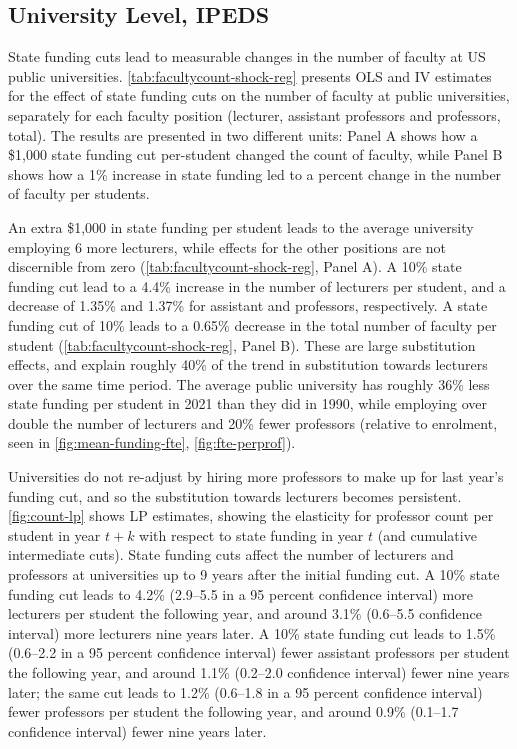 \subsection{University Level, IPEDS}
\label{sec:results-ipeds}
State funding cuts lead to measurable changes in the number of faculty at US public universities.
\autoref{tab:facultycount-shock-reg} presents OLS and IV estimates for the effect of state funding cuts on the number of faculty at public universities, separately for each faculty position (lecturer, assistant professors and professors, total).
The results are presented in two different units: Panel A shows how a \$1,000 state funding cut per-student changed the count of faculty, while Panel B shows how a 1\% increase in state funding led to a percent change in the number of faculty per students.

An extra \$1,000 in state funding per student leads to the average university employing 6 more lecturers, while effects for the other positions are not discernible from zero (\autoref{tab:facultycount-shock-reg}, Panel A).
A 10\% state funding cut lead to a 4.4\% increase in the number of lecturers per student, and a decrease of 1.35\% and 1.37\% for assistant and professors, respectively.
A state funding cut of 10\% leads to a 0.65\% decrease in the total number of faculty per student (\autoref{tab:facultycount-shock-reg}, Panel B).
These are large substitution effects, and explain roughly 40\% of the trend in substitution towards lecturers over the same time period.
The average public university has roughly 36\% less state funding per student in 2021 than they did in 1990, while employing over double the number of lecturers and 20\% fewer professors (relative to enrolment, seen in \autoref{fig:mean-funding-fte}, \ref{fig:fte-perprof}).

Universities do not re-adjust by hiring more professors to make up for last year's funding cut, and so the substitution towards lecturers becomes persistent.
\autoref{fig:count-lp} shows LP estimates, showing the elasticity for professor count per student in year $t+k$ with respect to state funding in year $t$ (and cumulative intermediate cuts).
State funding cuts affect the number of lecturers and professors at universities up to 9 years after the initial funding cut.
A 10\% state funding cut leads to 4.2\% (2.9--5.5 in a 95 percent confidence interval) more lecturers per student the following year, and around 3.1\% (0.6--5.5 confidence interval) more lecturers nine years later.
A 10\% state funding cut leads to 1.5\% (0.6--2.2 in a 95 percent confidence interval) fewer assistant professors per student the following year, and around 1.1\% (0.2--2.0 confidence interval) fewer nine years later;
the same cut leads to 1.2\% (0.6--1.8 in a 95 percent confidence interval) fewer professors per student the following year, and around 0.9\% (0.1--1.7 confidence interval) fewer nine years later.

